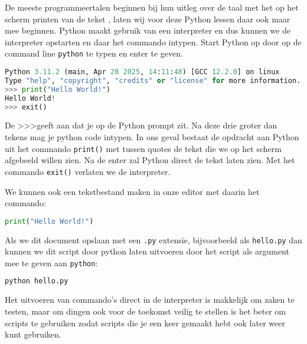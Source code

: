De meeste programmeertalen beginnen bij hun uitleg over de taal met het op het scherm printen van de tekst , laten wij voor deze Python lessen daar ook maar mee beginnen. Python maakt gebruik van een interpreter en dus kunnen we de interpreter opstarten en daar het commando intypen. Start Python op door op de command line \texttt{python} te typen en enter te geven.
\begin{lstlisting}[language=python]
Python 3.11.2 (main, Apr 28 2025, 14:11:48) [GCC 12.2.0] on linux
Type "help", "copyright", "credits" or "license" for more information.
>>> print("Hello World!")
Hello World!
>>> exit()
\end{lstlisting}
De \textgreater\textgreater\textgreater geeft aan dat je op de Python prompt zit. Na deze drie groter dan tekens mag je python code intypen. In ons geval bestaat de opdracht aan Python uit het commando \texttt{print()} met tussen quotes de tekst die we op het scherm afgebeeld willen zien. Na de enter zal Python direct de tekst laten zien. Met het commando \texttt{exit()} verlaten we de interpreter.

We kunnen ook een tekstbestand maken in onze editor met daarin het commando:
\begin{lstlisting}[language=python]
print("Hello World!")
\end{lstlisting}
Als we dit document opslaan met een \texttt{.py} extensie, bijvoorbeeld als \texttt{hello.py} dan kunnen we dit script door python laten uitvoeren door het script als argument mee te geven aan \texttt{python}:
\begin{lstlisting}[language=python]
python hello.py
\end{lstlisting}

Het uitvoeren van commando's direct in de interpreter is makkelijk om zaken te testen, maar om dingen ook voor de toekomst veilig te stellen is het beter om scripts te gebruiken zodat scripts die je een keer gemaakt hebt ook later weer kunt gebruiken.

